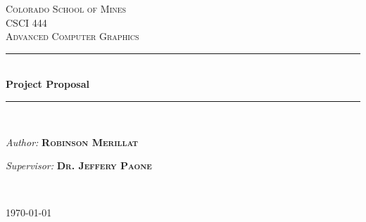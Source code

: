 \documentclass[12pt]{article}
\begin{document}
\begin{titlepage}

\newcommand{\HRule}{\rule{\linewidth}{0.5mm}} %

\center %
 

\textsc{\LARGE Colorado School of Mines}\\[1.5cm] %
\textsc{\Large CSCI 444}\\[0.5cm] %
\textsc{\large Advanced Computer Graphics}\\[0.5cm] %


\HRule \\[0.6cm]
{ \huge \bfseries Project Proposal}\\[0.4cm] %
\HRule \\[1.0cm]
 

\begin{minipage}{0.4\textwidth}
    \begin{flushleft}
        \emph{Author:}  
        \medskip
        {\textsc{\textbf{Robinson Merillat }}}   %
    \end{flushleft}
\end{minipage}
\begin{minipage}{0.45\textwidth}
    \begin{flushright} \large
        \emph{Supervisor:}
        {\textsc{\textbf{Dr. Jeffery Paone }}} %
    \end{flushright}
\end{minipage}\\[1cm]

\begin{center}
{\large \today}
\end{center}


\end{titlepage}
\end{document}
